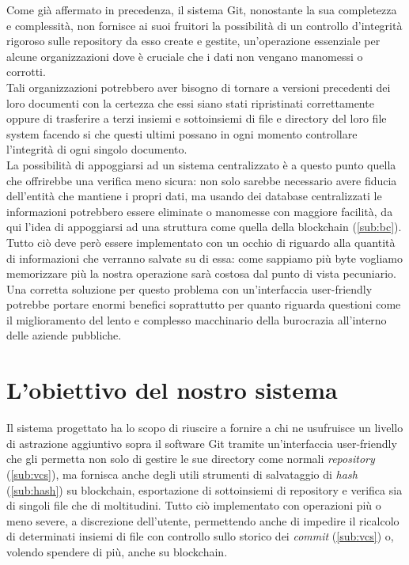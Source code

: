 
Come già affermato in precedenza, il sistema Git,
nonostante la sua completezza e complessità,
non fornisce ai suoi fruitori la possibilità di un controllo d’integrità rigoroso
sulle repository da esso create e gestite, un’operazione essenziale per
alcune organizzazioni dove è cruciale che i dati non vengano manomessi o corrotti. \\
Tali organizzazioni potrebbero aver bisogno di tornare a versioni precedenti
dei loro documenti con la certezza che essi siano stati ripristinati
correttamente oppure di trasferire a terzi insiemi e sottoinsiemi
di file e directory del loro file system facendo si che questi ultimi
possano in ogni momento controllare l’integrità di ogni singolo documento. \\
La possibilità di appoggiarsi ad un sistema centralizzato è a questo punto quella
che offrirebbe una verifica meno sicura: non solo sarebbe necessario avere fiducia
dell'entità che mantiene i propri dati, ma usando dei database centralizzati le informazioni
potrebbero essere eliminate o manomesse con maggiore facilità,
da qui l’idea di appoggiarsi ad una struttura come quella della blockchain (\autoref{sub:bc}).
Tutto ciò deve però essere implementato con un occhio di riguardo alla quantità
di informazioni che verranno salvate su di essa: come sappiamo più byte vogliamo
memorizzare più la nostra operazione sarà costosa dal punto di vista pecuniario.
Una corretta soluzione per questo problema con un’interfaccia user-friendly
potrebbe portare enormi benefici soprattutto per quanto riguarda questioni
come il miglioramento del lento e complesso macchinario della burocrazia
all'interno delle aziende pubbliche. 

\section{L’obiettivo del nostro sistema}

Il sistema progettato ha lo scopo di riuscire a fornire a chi ne usufruisce
un livello di astrazione aggiuntivo sopra il software Git tramite un’interfaccia
user-friendly che gli permetta non solo di gestire le sue directory come normali
\emph{repository} (\autoref{sub:vcs}), ma fornisca anche degli utili strumenti di
salvataggio di \emph{hash} (\autoref{sub:hash}) su blockchain, esportazione di sottoinsiemi di repository
e verifica sia di singoli file che di moltitudini.
Tutto ciò implementato con operazioni più o meno severe, a discrezione dell’utente,
permettendo anche di impedire il ricalcolo di determinati insiemi di file con controllo
sullo storico dei \emph{commit} (\autoref{sub:vcs}) o, volendo spendere di più, anche su blockchain.

